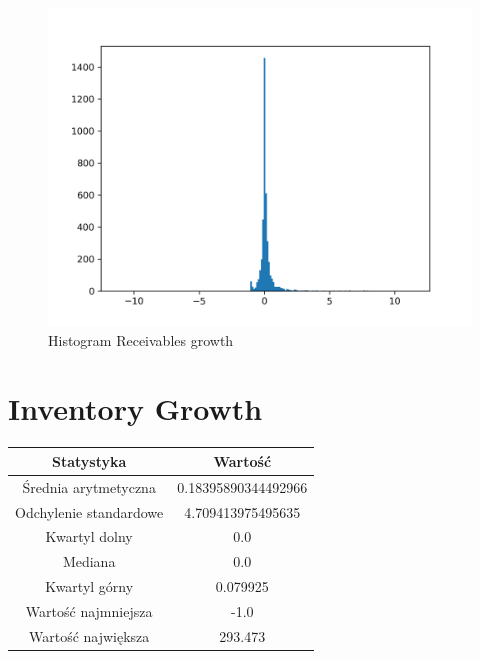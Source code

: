 \documentclass{article}
\begin{document}
\begin{figure}[h!]
    \includegraphics[width=\linewidth]{variables/Receivables growth.png}
    \caption{Histogram Receivables growth }
\end{figure}\section{ Inventory Growth }

\begin{center}
    \begin{tabular}{|c | c|} 
    \hline
    Statystyka & Wartość \\
    \hline\hline
    Średnia arytmetyczna & 0.18395890344492966 \\ 
    \hline
    Odchylenie standardowe & 4.709413975495635 \\
    \hline
    Kwartyl dolny & 0.0 \\
    \hline
    Mediana & 0.0 \\
    \hline
    Kwartyl górny & 0.079925 \\
    \hline
    Wartość najmniejsza & -1.0 \\
    \hline
    Wartość największa & 293.473 \\
    \hline
   \end{tabular}
\end{center}
\end{document}
